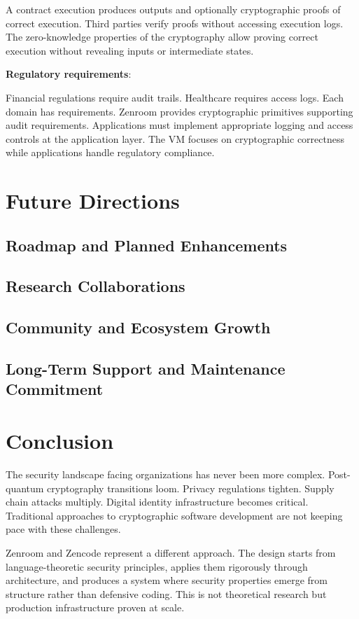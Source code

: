 A contract execution produces outputs and optionally cryptographic
proofs of correct execution. Third parties verify proofs without
accessing execution logs. The zero-knowledge properties of the
cryptography allow proving correct execution without revealing inputs
or intermediate states.

\textbf{Regulatory requirements}:

Financial regulations require audit trails. Healthcare requires access
logs. Each domain has requirements. Zenroom provides cryptographic
primitives supporting audit requirements. Applications must implement
appropriate logging and access controls at the application layer. The
VM focuses on cryptographic correctness while applications handle
regulatory compliance.

\section{Future Directions}
\subsection{Roadmap and Planned Enhancements}
\subsection{Research Collaborations}
\subsection{Community and Ecosystem Growth}
\subsection{Long-Term Support and Maintenance Commitment}

\section{Conclusion}

The security landscape facing organizations has never been more
complex. Post-quantum cryptography transitions loom. Privacy
regulations tighten. Supply chain attacks multiply. Digital identity
infrastructure becomes critical. Traditional approaches to
cryptographic software development are not keeping pace with these
challenges.

Zenroom and Zencode represent a different approach. The design starts
from language-theoretic security principles, applies them rigorously
through architecture, and produces a system where security properties
emerge from structure rather than defensive coding. This is not
theoretical research but production infrastructure proven at scale.

